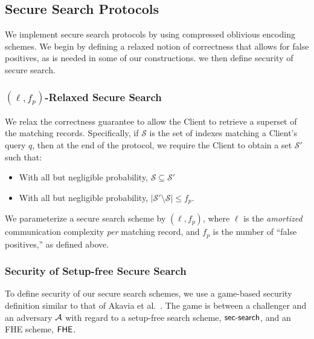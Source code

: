 \subsection{Secure Search Protocols}
\label{sec:ssp}
We implement secure search protocols by using compressed oblivious
encoding schemes. We begin by defining a relaxed notion of correctness
that allows for false positives, as is needed in some of our
constructions.  we then define security of secure search.

\subsubsection{$(\ell, f_p)$-Relaxed Secure Search} 

We relax the correctness guarantee to allow the Client to retrieve  a
superset of the matching records.  Specifically, if $\mathcal{S}$ is the
set of indexes matching a Client's query $q$, then at the end of the
protocol, we require the Client to obtain a set $\mathcal{S}'$ such
that:
\begin{itemize}
    \item With all but negligible probability, $\mathcal{S} \subseteq \mathcal{S}'$
    \item With all but negligible probability, $|\mathcal{S}'\setminus \mathcal{S}| \leq f_p$.
\end{itemize}

We parameterize a secure search scheme by $(\ell, f_p)$, where $\ell$ is
the \emph{amortized} communication complexity {\em per} matching record, and $f_p$ is the
number of ``false positives,'' as defined above.

\subsubsection{Security of Setup-free Secure Search} 
To define security of our secure search schemes, we use a game-based
security definition similar to that of Akavia et al.~\cite{PETS:AGHL19}.
The game is between a challenger and an adversary $\mathcal{A}$ with regard to a
setup-free search scheme, $\mathsf{sec\mbox{-}search}$, and an FHE scheme, $\mathsf{FHE}$.


